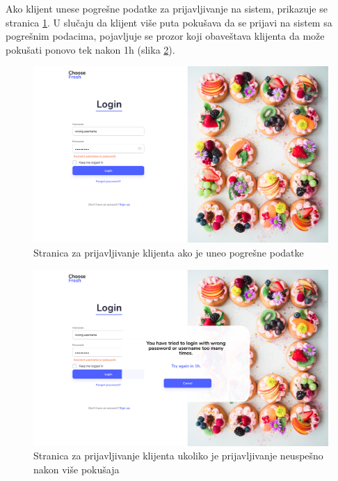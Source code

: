 Ako klijent unese pogrešne podatke za prijavljivanje na sistem, prikazuje se stranica \ref{fig:WrongInput}. U slučaju da klijent više puta pokušava da se prijavi na sistem sa pogrešnim podacima, pojavljuje se prozor koji obaveštava klijenta da može pokušati ponovo tek nakon 1h (slika \ref{fig:BruteForceAttack}).
\begin{figure}[H]
	\begin{center}
		\includegraphics[width=\textwidth]{UI/WrongInput.jpg}
    		\caption{Stranica za prijavljivanje klijenta ako je uneo pogrešne podatke}
    \label{fig:WrongInput}
    \end{center}
\end{figure}

\begin{figure}[H]
	\begin{center}
		\includegraphics[width=\textwidth]{UI/BruteForceAttack.jpg}
    		\caption{Stranica za prijavljivanje klijenta ukoliko je prijavljivanje neuspešno nakon više pokušaja}
    \label{fig:BruteForceAttack}
    \end{center}
\end{figure}